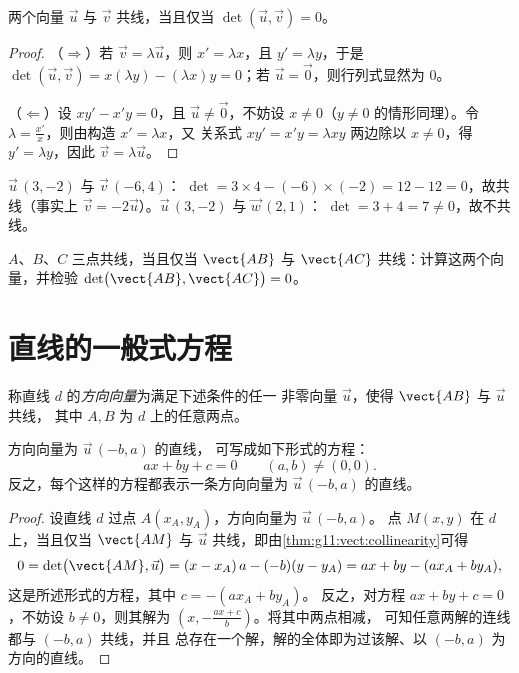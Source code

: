 \begin{theorem}[共线判定准则]\label{thm:g11:vect:collinearity}
两个向量 $\vec u$ 与 $\vec v$ 共线，当且仅当
$\det(\vec u, \vec v) = 0$。
\end{theorem}

\begin{proof}
（$\Rightarrow$）若 $\vec v = \lambda\vec u$，则 $x' = \lambda x$，且
$y' = \lambda y$，于是
$\det(\vec u, \vec v) = x(\lambda y) - (\lambda x)y = 0$；若
$\vec u = \vec 0$，则行列式显然为 $0$。

（$\Leftarrow$）设 $xy' - x'y = 0$，且 $\vec u \neq \vec 0$，不妨设
$x \neq 0$（$y \neq 0$ 的情形同理）。令
$\lambda = \frac{x'}{x}$，则由构造 $x' = \lambda x$，又
关系式 $xy' = x'y = \lambda x y$ 两边除以 $x \neq 0$，得
$y' = \lambda y$，因此 $\vec v = \lambda \vec u$。
\end{proof}

\begin{example}\label{ex:g11:vect:collinear}
$\vec u\,(3, -2)$ 与 $\vec v\,(-6, 4)$：
$\det = 3 \times 4 - (-6) \times (-2) = 12 - 12 = 0$，故共线（事实上
$\vec v = -2\vec u$）。$\vec u\,(3, -2)$ 与 $\vec w\,(2, 1)$：
$\det = 3 + 4 = 7 \neq 0$，故不共线。
\end{example}

\begin{method}[三点共线]\label{met:g11:vect:alignment}
$A$、$B$、$C$ 三点共线，当且仅当 $\vect{AB}$ 与 $\vect{AC}$
共线：计算这两个向量，并检验
$\det\bigl(\vect{AB}, \vect{AC}\bigr) = 0$。
\end{method}

\section{直线的一般式方程}

\begin{definition}[方向向量]\label{def:g11:vect:direction}
称直线 $d$ 的\emph{方向向量}为满足下述条件的任一
非零向量 $\vec u$，使得 $\vect{AB}$ 与 $\vec u$ 共线，
其中 $A, B$ 为 $d$ 上的任意两点。
\end{definition}

\begin{theorem}[一般式方程]\label{thm:g11:vect:cartesian}
方向向量为 $\vec u\,(-b, a)$ 的直线，
可写成如下形式的方程：
\[
ax + by + c = 0
\qquad (a, b) \neq (0, 0).
\]
反之，每个这样的方程都表示一条方向向量为
$\vec u\,(-b, a)$ 的直线。
\end{theorem}

\begin{proof}
设直线 $d$ 过点 $A(x_A, y_A)$，方向向量为 $\vec u\,(-b, a)$。
点 $M(x, y)$ 在 $d$ 上，当且仅当 $\vect{AM}$ 与
$\vec u$ 共线，即由\cref{thm:g11:vect:collinearity}可得
\[
0 = \det\bigl(\vect{AM}, \vec u\bigr)
= (x - x_A)\,a - (-b)(y - y_A)
= ax + by - (a x_A + b y_A),
\]
这是所述形式的方程，其中 $c = -(a x_A + b y_A)$。
反之，对方程 $ax + by + c = 0$，不妨设 $b \neq 0$，则其解为
$\left(x, -\frac{a x + c}{b}\right)$。将其中两点相减，
可知任意两解的连线都与 $(-b, a)$ 共线，并且
总存在一个解，解的全体即为过该解、以 $(-b, a)$ 为方向的直线。
\end{proof}

